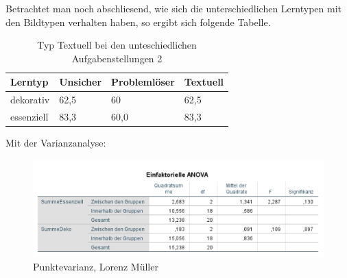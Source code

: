 Betrachtet man noch abschliesend, wie sich die unterschiedlichen Lerntypen mit den Bildtypen verhalten haben, so ergibt sich folgende Tabelle.

\begin{table}[!h]
\hspace{-5pt}
\begin{tabularx}{\textwidth + 5pt}{| @{\hspace{3pt}} M | @{\hspace{3pt}} M  | @{\hspace{3pt}} M | @{\hspace{3pt}} M |}
\hline
\textbf{Lerntyp} & \textbf{Unsicher} & \textbf{Problemlöser} & \textbf{Textuell}\\
\hline
\hline
    dekorativ & 62,5 & 60 &  62,5\\
\hline
    essenziell & 83,3 & 60,0 &  83,3\\
\hline
\end{tabularx}
\caption{Typ Textuell bei den unteschiedlichen Aufgabenstellungen 2}
\end{table}

Mit der Varianzanalyse: 

\begin{figure}[!ht]
\noindent\hspace{0.5mm}\includegraphics[width=15cm]{./Ressourcen/DekoEssGruppen.png}
\caption{Punktevarianz, Lorenz Müller}
\end{figure}


